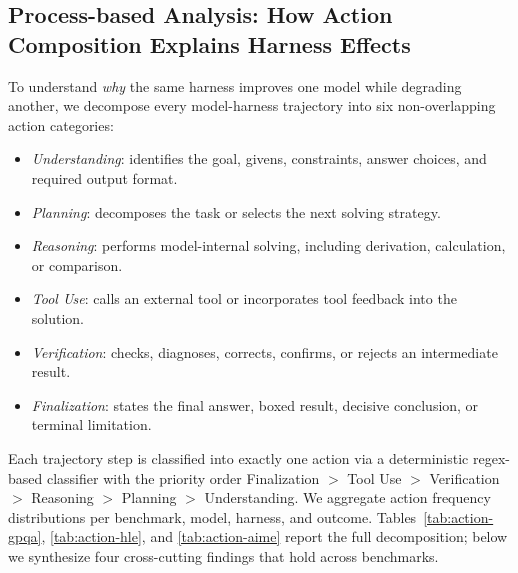 \subsection{Process-based Analysis: How Action Composition Explains Harness Effects}
\label{sec:macro_process}
\vspace{-4pt}

To understand \emph{why} the same harness improves one model while degrading another, we decompose every model-harness trajectory into six non-overlapping action categories:
\begin{itemize}[leftmargin=*, itemsep=0pt, topsep=0.5pt]
    \item \emph{Understanding}: identifies the goal, givens, constraints, answer choices, and required output format.
    \item \emph{Planning}: decomposes the task or selects the next solving strategy.
    \item \emph{Reasoning}: performs model-internal solving, including derivation, calculation, or comparison.
    \item \emph{Tool Use}: calls an external tool or incorporates tool feedback into the solution.
    \item \emph{Verification}: checks, diagnoses, corrects, confirms, or rejects an intermediate result.
    \item \emph{Finalization}: states the final answer, boxed result, decisive conclusion, or terminal limitation.
\end{itemize}

Each trajectory step is classified into exactly one action via a deterministic regex-based classifier with the priority order Finalization \(>\) Tool Use \(>\) Verification \(>\) Reasoning \(>\) Planning \(>\) Understanding.
We aggregate action frequency distributions per benchmark, model, harness, and outcome.
Tables~\ref{tab:action-gpqa}, \ref{tab:action-hle}, and \ref{tab:action-aime} report the full decomposition; below we synthesize four cross-cutting findings that hold across benchmarks.


